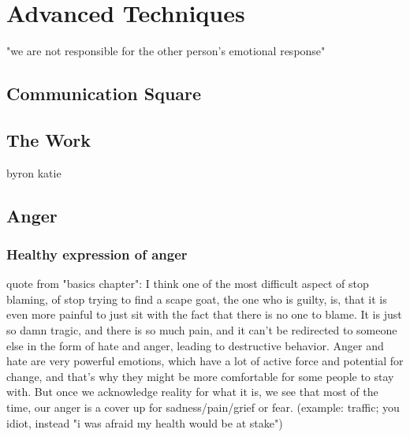 \chapter{Advanced Techniques}\label{ch:advanced-techniques}





"we are not responsible for the other person's emotional response"



\section{Communication Square}\label{sec:communication-square}

\section{The Work}\label{sec:the-work}

byron katie

\section{Anger}\label{sec:anger}

\subsection{Healthy expression of anger}\label{subsec:healthy-expression-of-anger}


quote from "basics chapter": I think one of the most difficult aspect of stop blaming, of stop trying to find a scape goat, the one who is guilty, is, that it is even more painful to just sit with the fact that there is no one to blame.
It is just so damn tragic, and there is so much pain, and it can't be redirected to someone else in the form of hate and anger, leading to destructive behavior.
Anger and hate are very powerful emotions, which have a lot of active force and potential for change, and that's why they might be more comfortable for some people to stay with.
But once we acknowledge reality for what it is, we see that most of the time, our anger is a cover up for sadness/pain/grief or fear. (example: traffic; you idiot, instead "i was afraid my health would be at stake")

